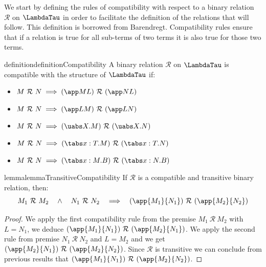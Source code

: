 \newcommand{\R}{\mathcal{R}}
\newcommand{\Rs}{\ \R\ }
\newcommand{\rcompatible}{$\R$-compatible\xspace}
\newcommand{\rcompatibility}{$\R$-compatibility\xspace}

We start by defining the rules of compatibility with respect to a binary relation $\R$ on $\LambdaTau$ in order to facilitate the definition of the relations that will follow. This definition is borrowed from Barendregt\cite{barendregt1984}. Compatibility rules ensure that if a relation is true for all sub-terms of two terms it is also true for those two terms.

\begin{reusable}{definition}{definitionCompatibility}
A binary relation $\R$ on $\LambdaTau$ is compatible with the structure of $\LambdaTau$ if:

\begin{itemize}
    \raggedright
    \item $M\ \R\ N \implies (\app M L)\ \R\ (\app N L)$
    \item $M\ \R\ N \implies (\app L M)\ \R\ (\app L N)$
    \item $M\ \R\ N \implies (\uabs X.M)\ \R\ (\uabs X.N)$
    \item $M\ \R\ N \implies (\tabs x:T.M)\ \R\ (\tabs x:T.N)$
    \item $M\ \R\ N \implies (\tabs x:M.B)\ \R\ (\tabs x:N.B)$
\end{itemize}
\end{reusable}

\begin{reusable}{lemma}{lemmaTransitiveCompatibility}
    If $\R$ is a compatible and transitive binary relation, then:
    \[
        M_1\ \R\ M_2 \quad\land\quad N_1\ \R\ N_2 \quad\Longrightarrow\quad (\app {M_1} {N_1}) \Rs (\app {M_2} {N_2})
    \]
\end{reusable}

\begin{proof}
    We apply the first compatibility rule from the premise $M_1 \Rs M_2$ with $L=N_1$, we deduce $(\app {M_1} {N_1}) \Rs (\app {M_2} {N_1})$. We apply the second rule from premise $N_1 \Rs N_2$ and $L=M_2$ and we get $(\app {M_2} {N_1}) \Rs (\app {M_2} {N_2})$. Since $\R$ is transitive we can conclude from previous results that $(\app {M_1} {N_1}) \Rs (\app {M_2} {N_2})$.
\end{proof}